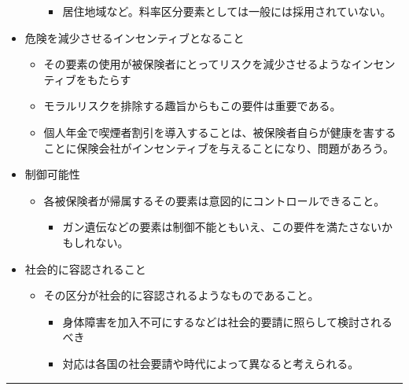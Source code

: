 \documentclass[]{article}
\begin{document}
\begin{itemize}
\begin{itemize}
    \begin{itemize}
    \tightlist
    \item
      居住地域など。料率区分要素としては一般には採用されていない。
    \end{itemize}
  \end{itemize}
\item
  危険を減少させるインセンティブとなること

  \begin{itemize}
  \tightlist
  \item
    その要素の使用が被保険者にとってリスクを減少させるようなインセンティブをもたらす
  \item
    モラルリスクを排除する趣旨からもこの要件は重要である。
  \item
    個人年金で喫煙者割引を導入することは、被保険者自らが健康を害することに保険会社がインセンティブを与えることになり、問題があろう。
  \end{itemize}
\item
  制御可能性

  \begin{itemize}
  \tightlist
  \item
    各被保険者が帰属するその要素は意図的にコントロールできること。

    \begin{itemize}
    \tightlist
    \item
      ガン遺伝などの要素は制御不能ともいえ、この要件を満たさないかもしれない。
    \end{itemize}
  \end{itemize}
\item
  社会的に容認されること

  \begin{itemize}
  \tightlist
  \item
    その区分が社会的に容認されるようなものであること。

    \begin{itemize}
    \tightlist
    \item
      身体障害を加入不可にするなどは社会的要請に照らして検討されるべき
    \item
      対応は各国の社会要請や時代によって異なると考えられる。
    \end{itemize}
  \end{itemize}
\end{itemize}

\begin{center}\rule{0.5\linewidth}{0.5pt}\end{center}
\end{document}

